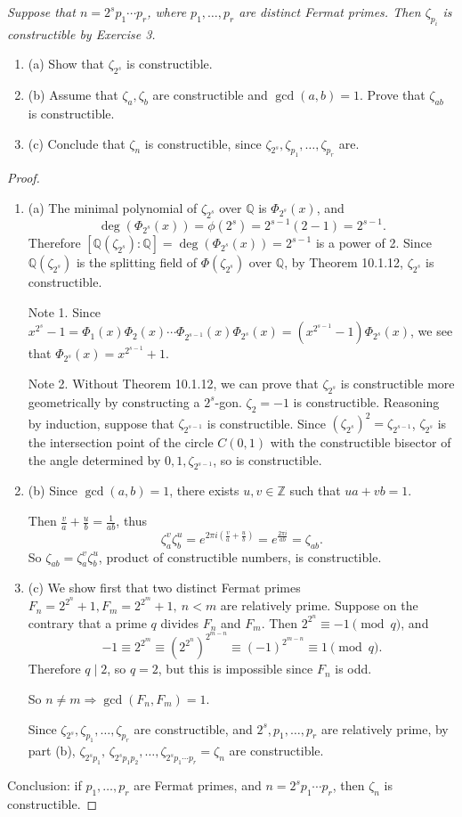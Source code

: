 \documentclass[11pt,a4paper]{article}
\newcommand{\be} {\begin{enumerate}}
\newcommand{\ee} {\end{enumerate}}
\newcommand{\Q}{\mathbb{Q}}
\newcommand{\Z}{\mathbb{Z}}
\begin{document}
{\it Suppose that $n = 2^s p_1\cdots p_r$, where $p_1,\ldots,p_r$ are distinct Fermat primes. Then $\zeta_{p_i}$ is constructible by Exercise 3.
\be
\item[(a)] Show that $\zeta_{2^s}$ is constructible.
\item[(b)] Assume that $\zeta_a,\zeta_b$ are constructible and $\gcd(a,b) = 1$. Prove that $\zeta_{ab}$ is constructible.
\item[(c)] Conclude that $\zeta_n$ is constructible, since $\zeta_{2^s},\zeta_{p_1},\ldots, \zeta_{p_r}$ are.
\ee
}

\begin{proof}
\be
\item[(a)] The minimal polynomial of $\zeta_{2^s}$ over $\Q$ is $\Phi_{2^s}(x)$, and $$\deg(\Phi_{2^s}(x)) = \phi(2^s) = 2^{s-1}(2-1) = 2^{s-1}.$$ Therefore $[\Q(\zeta_{2^s}) : \Q] = \deg(\Phi_{2^s}(x)) = 2^{s-1}$ is a power of 2. Since $\Q(\zeta_{2^s})$ is the splitting field of $\Phi(\zeta_{2^s})$ over $\Q$, by Theorem 10.1.12, $\zeta_{2^s}$ is constructible.

Note 1. Since $x^{2^s} - 1 = \Phi_1(x)\Phi_2(x)\cdots \Phi_{2^{s-1}}(x) \Phi_{2^s}(x) = (x^{2^{s-1}}-1) \Phi_{2^s}(x)$, we see that $\Phi_{2^s}(x) = x^{2^{s-1}} +1$. 

Note 2. Without Theorem 10.1.12, we can prove that $\zeta_{2^s}$ is constructible more geometrically by constructing a $2^s$-gon. $\zeta_{2} = -1$ is constructible. Reasoning by induction, suppose that $\zeta_{2^{s-1}}$ is constructible. Since $(\zeta_{2^s})^2 = \zeta_{2^{s-1}}$, $\zeta_{2^s}$ is the intersection point of the circle $C(0,1)$ with the constructible bisector of the angle determined by $0,1,\zeta_{2^{s-1}}$, so is constructible.

\item[(b)] 
Since $\gcd(a,b) = 1$, there exists $u,v \in \Z$ such that $ua+vb = 1$.

Then $\frac{v}{a}+ \frac{u}{b} = \frac{1}{ab}$, thus 
$$\zeta_a^v \zeta_b^u = e^{2\pi i \left(\frac{v}{a}+ \frac{u}{b} \right)} = e^{\frac{2\pi i }{ab}} = \zeta_{ab}.$$
So $\zeta_{ab} = \zeta_a^v \zeta_b^u$, product of constructible numbers, is constructible.

\item[(c)] 
We show first that two distinct Fermat primes $F_n = 2^{2^n} +1, F_m = 2^{2^m}+1, \ n < m$ are relatively prime. Suppose on the contrary that a prime $q$ divides $F_n$ and $F_m$. Then $2^{2^n} \equiv -1 \pmod q$, and
$$-1 \equiv 2^{2^m} \equiv (2^{2^n})^{2^{m-n}} \equiv (-1)^{2^{m-n}} \equiv 1 \pmod q.$$
Therefore $q\mid 2$, so $q=2$, but this is impossible since $F_n$ is odd. 

So $n\ne m \Rightarrow \gcd(F_n,F_m) = 1$.

Since $\zeta_{2^s},\zeta_{p_1},\ldots, \zeta_{p_r}$ are constructible, and $2^s,p_1,\ldots,p_r$ are relatively prime, by part (b), $\zeta_{2^s p_1},\, \zeta_{2^s p_1 p_2}, \ldots, \zeta_{ 2^s p_1\cdots p_r} = \zeta_n$ are constructible. 
\ee

\bigskip

Conclusion: if $p_1,\ldots,p_r$ are Fermat primes, and $n = 2^s p_1\cdots p_r$, then $\zeta_n$ is constructible.
\end{proof}
\end{document}

